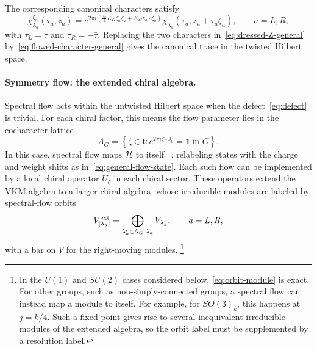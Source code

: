 \documentclass[11pt]{article}
\numberwithin{equation}{section}
\begin{document}
The corresponding canonical characters satisfy
\begin{equation}
\chi^{\zeta_a}_{\lambda_a}(\tau_a,z_a)
 =e^{2\pi i\left(\frac{\tau_a}{2} K_G\zeta_a^\cdot \zeta_a
                      + K_G z_a\cdot  \zeta_a\right)}
   \chi_{\lambda_a}(\tau_a,z_a+\tau_a\zeta_a),
 \qquad a=L,R,
\label{eq:flowed-character-general}
\end{equation}
with $\tau_L=\tau$ and $\tau_R=-\bar\tau$. Replacing the two characters in~\eqref{eq:dressed-Z-general} by~\eqref{eq:flowed-character-general} gives the canonical trace in the twisted Hilbert space.

\paragraph{Symmetry flow: the extended chiral algebra.}
Spectral flow acts within the untwisted Hilbert space when the defect~\eqref{eq:defect} is trivial. For each chiral factor, this means the flow parameter lies in the cocharacter lattice
\begin{equation}
\Lambda_G=\left\{\zeta\in\mathfrak t:
                 e^{2\pi i\zeta\cdot J_0}=\mathbf1\ \text{in }G\right\}.
\label{eq:cocharacter-lattice}
\end{equation}
In this case, spectral flow maps $\mathcal H$ to itself ~\cite{Schwimmer:1986mf,Benjamin:2020swg}, relabeling states with the charge and weight shifts as in~\eqref{eq:general-flow-state}.
Each such flow can be implemented by a local chiral operator $U_{\zeta}$ in each chiral sector. These operators extend the VKM algebra to a larger
chiral algebra, whose irreducible modules are labeled by spectral-flow
orbits
\begin{equation}
V^{\rm ext}_{[\lambda_a]}
 =\bigoplus_{\lambda'_a\in\Lambda_G\cdot\lambda_a}V_{\lambda'_a},
 \qquad a=L,R,
\label{eq:orbit-module}
\end{equation}
with a bar on $V$ for the right-moving modules.
\footnote{In the $U(1)$ and $SU(2)$ cases considered below,
\eqref{eq:orbit-module} is exact. For other groups, such as non-simply-connected groups, a spectral flow can instead map a module to itself. For example, for $SO(3)_k$, this happens at $j=k/4$. Such a fixed point gives rise to several inequivalent irreducible modules of the extended algebra, so the orbit label must be supplemented by a resolution label.}
\end{document}
